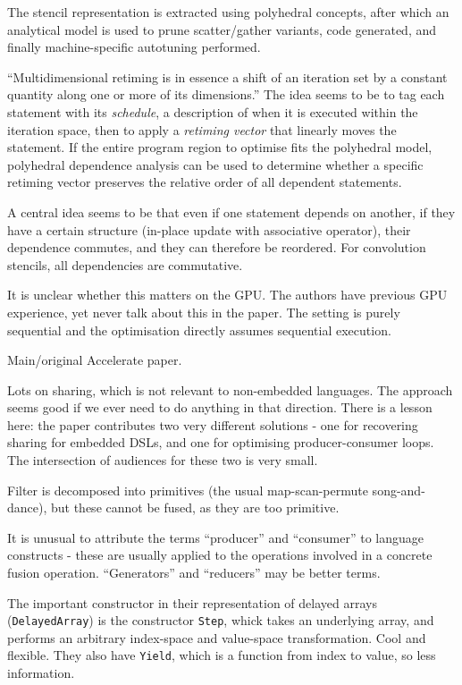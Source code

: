 \documentclass[a4paper, oneside, final]{memoir}
\begin{document}
The stencil representation is extracted using polyhedral concepts,
after which an analytical model is used to prune scatter/gather
variants, code generated, and finally machine-specific autotuning
performed.

``Multidimensional retiming is in essence a shift of an iteration set
by a constant quantity along one or more of its dimensions.''  The
idea seems to be to tag each statement with its \textit{schedule}, a
description of when it is executed within the iteration space, then to
apply a \textit{retiming vector} that linearly moves the statement.
If the entire program region to optimise fits the polyhedral model,
polyhedral dependence analysis can be used to determine whether a
specific retiming vector preserves the relative order of all dependent
statements.

A central idea seems to be that even if one statement depends on
another, if they have a certain structure (in-place update with
associative operator), their dependence commutes, and they can
therefore be reordered.  For convolution stencils, all dependencies
are commutative.

It is unclear whether this matters on the GPU.  The authors have
previous GPU experience, yet never talk about this in the paper.  The
setting is purely sequential and the optimisation directly assumes
sequential execution.

\begin{quote}
\end{quote}

Main/original Accelerate paper.

Lots on sharing, which is not relevant to non-embedded languages.  The
approach seems good if we ever need to do anything in that direction.
There is a lesson here: the paper contributes two very different
solutions - one for recovering sharing for embedded DSLs, and one for
optimising producer-consumer loops.  The intersection of audiences for
these two is very small.

Filter is decomposed into primitives (the usual map-scan-permute
song-and-dance), but these cannot be fused, as they are too primitive.

It is unusual to attribute the terms ``producer'' and ``consumer'' to
language constructs - these are usually applied to the operations
involved in a concrete fusion operation.  ``Generators'' and
``reducers'' may be better terms.

The important constructor in their representation of delayed arrays
(\texttt{DelayedArray}) is the constructor \texttt{Step}, whick takes
an underlying array, and performs an arbitrary index-space and
value-space transformation.  Cool and flexible.  They also have
\texttt{Yield}, which is a function from index to value, so less
information.
\end{document}
